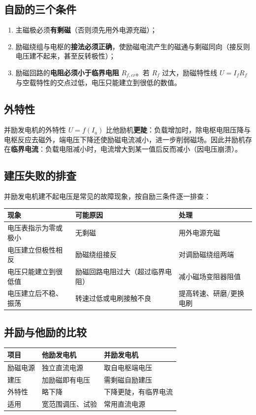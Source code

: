 \subsection{自励的三个条件}
\begin{enumerate}
  \item 主磁极必须\textbf{有剩磁}（否则须先用外电源充磁）；
  \item 励磁绕组与电枢的\textbf{接法必须正确}，使励磁电流产生的磁通与剩磁同向（接反则电压建不起来，甚至反转极性）；
  \item 励磁回路的\textbf{电阻必须小于临界电阻} $R_{f,cr}$。若 $R_f$ 过大，励磁特性线 $U=I_fR_f$ 与空载特性的交点过低，电压只能建立到很低的数值。
\end{enumerate}


\subsection{外特性}
并励发电机的外特性 $U=f(I_a)$ 比他励机\textbf{更陡}：负载增加时，除电枢电阻压降与电枢反应去磁外，端电压下降还使励磁电流减小，进一步削弱磁场。因此并励机存在\textbf{临界电流}：负载电阻减小时，电流增大到某一值后反而减小（因电压崩溃）。

\subsection{建压失败的排查}
并励发电机建不起电压是常见的故障现象，按自励三条件逐一排查：

\begin{center}
\begin{tabular}{@{}p{3.2cm}p{4.0cm}p{4.8cm}@{}}
\toprule
现象 & 可能原因 & 处理 \\
\midrule
电压表指示为零或极小 & 无剩磁 & 用外电源充磁 \\
电压建立但极性相反 & 励磁绕组接反 & 对调励磁绕组两端 \\
电压只能建立到很低值 & 励磁回路电阻过大（超过临界电阻） & 减小磁场变阻器阻值 \\
电压建立后不稳、振荡 & 转速过低或电刷接触不良 & 提高转速、研磨/更换电刷 \\
\bottomrule
\end{tabular}
\end{center}

\subsection{并励与他励的比较}
\begin{center}
\begin{tabular}{@{}p{2.2cm}p{4.0cm}p{4.4cm}@{}}
\toprule
项目 & 他励发电机 & 并励发电机 \\
\midrule
励磁电源 & 独立直流电源 & 取自电枢端电压 \\
建压 & 加励磁即有电压 & 需剩磁自励建压 \\
外特性 & 略下降 & 下降更陡，有临界电流 \\
适用 & 宽范围调压、试验 & 常用直流电源 \\
\bottomrule
\end{tabular}
\end{center}

